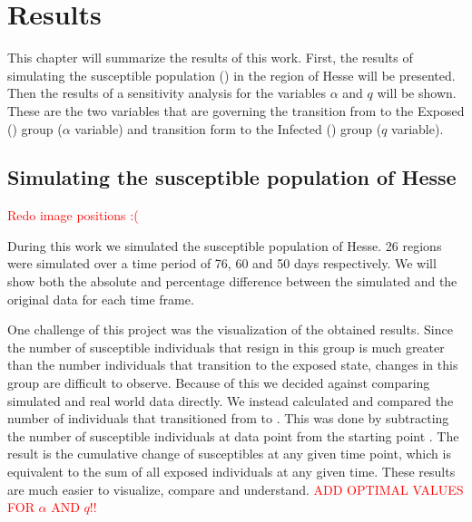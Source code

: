 
\chapter{Results} %

\label{chap:results} 
This chapter will summarize the results of this work. First, the results of simulating the susceptible population ()
in the region of Hesse will be presented. Then the results of a sensitivity analysis for the variables $\alpha$ and
$q$ will be shown. These are the two variables that are governing the transition from  to
the Exposed () group ($\alpha$ variable) and transition form  to the Infected () group ($q$ variable).



\section{Simulating the susceptible population of Hesse}
\label{sec:sim_res}
\textcolor{red}{Redo image positions :(}

During this work we simulated the susceptible population of Hesse. 26 regions were simulated over a time period of
76, 60 and 50 days respectively. We will show both the absolute and percentage difference between the simulated
and the original data for each time frame.

One challenge of this project was the visualization of the obtained results. Since the number of susceptible
individuals that resign in this group is much greater than the number individuals that transition to the exposed state,
changes in this group are difficult to observe. Because of this we decided against comparing simulated and real world
 data directly. We instead  calculated and compared the number of individuals that
transitioned from  to . This was done by subtracting the number of susceptible individuals at data point  from
the starting point . The result is the cumulative change of susceptibles at any given time point, which is equivalent to the 
sum of all exposed individuals at any given time. These results are much easier to visualize, compare and understand.
\textcolor{red}{ADD OPTIMAL VALUES FOR $\alpha$ AND $q$!!}
